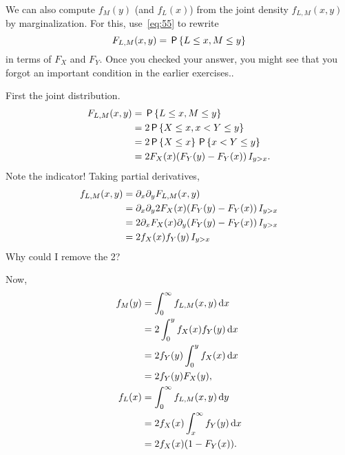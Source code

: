 \documentclass[a4paper,12pt]{article}
\begin{document}
\begin{exercise}
We can also compute $f_{M}(y)$ (and $f_{L}(x)$) from the joint density $f_{L,M}(x,y)$ by marginalization. For this, use~\cref{eq:55} to rewrite 
\begin{equation*}
  F_{L,M}(x,y) = \P{L\leq x, M\leq y}
\end{equation*}
in terms of $F_X$ and $F_Y$.
Once you checked your answer, you might see that you forgot an important condition in the earlier exercises..
\begin{solution}
First the joint distribution.
  \begin{align}
    \label{eq:51}
F_{L,M}(x,y) &= \P{L\leq x, M \leq y} \\
&= 2\P{X \leq x, x < Y \leq y} \\
&= 2\P{X \leq x} \P{x < Y \leq y} \\
&= 2 F_{X}(x) (F_Y(y)-F_Y(x)) \1{y>x}.
  \end{align}
Note the indicator! 
Taking partial derivatives,
\begin{align}
  \label{eq:52}
f_{L,M}(x,y) 
&=\partial_x\partial_{y}F_{L,M}(x,y) \\  
&=\partial_x\partial_{y}2 F_{X}(x) (F_Y(y)-F_Y(x)) \1{y>x}\\
&=2 \partial_x F_{X}(x) \partial_{y} (F_Y(y)-F_Y(x)) \1 {y>x} \\
&= 2f_X(x) f_Y(y)\1{y>x} \\ 
\end{align}
Why could I remove the 2?

Now,
\begin{align}
  \label{eq:54}
  f_M(y) &=  \int_0^{\infty} f_{L,M}(x,y) \d x \\
&= 2 \int_0^{y} f_{X}(x) f_Y(y) \d x \\
&= 2 f_Y(y) \int_0^{y} f_{X}(x) \d x  \\
&= 2f_Y(y) F_X(y), \\
f_L(x) &=  \int_0^{\infty} f_{L,M}(x,y) \d y \\
&= 2 f_{X}(x) \int_x^{\infty} f_Y(y) \d x \\
&= 2 f_{X}(x) (1-F_Y(x)).
\end{align}



\end{solution}
\end{exercise}
\end{document}
